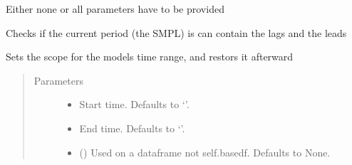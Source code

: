 \documentclass[letterpaper,10pt,english]{sphinxmanual}
\begin{document}
\begin{fulllineitems}
\begin{fulllineitems}
\sphinxAtStartPar
Either none or all parameters have to be provided

\end{fulllineitems}


\begin{fulllineitems}
\label{\detokenize{core/modelclass:modelclass.BaseModel.check_sim_smpl}}
\pysigstartsignatures
{}
\pysigstopsignatures
\sphinxAtStartPar
Checks if the current period (the SMPL) is can contain the lags and the leads

\end{fulllineitems}


\begin{fulllineitems}
\label{\detokenize{core/modelclass:modelclass.BaseModel.set_smpl}}
\pysigstartsignatures
{}
\pysigstopsignatures
\sphinxAtStartPar
Sets the scope for the models time range, and restors it afterward
\begin{quote}\begin{description}
\item[{Parameters}] \leavevmode\begin{itemize}
\item {} 
\sphinxAtStartPar
{} \textendash{} Start time. Defaults to ‘’.

\item {} 
\sphinxAtStartPar
{} \textendash{} End time. Defaults to ‘’.

\item {} 
\sphinxAtStartPar
{} (\sphinxstyleliteralemphasis{\sphinxupquote{, }}) \textendash{} Used on a dataframe not self.basedf. Defaults to None.


\end{itemize}
\end{description}
\end{quote}
\end{fulllineitems}
\end{fulllineitems}
\end{document}
